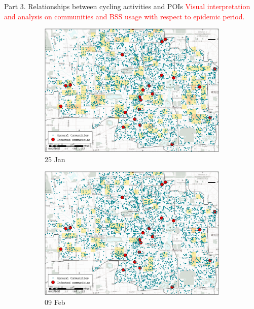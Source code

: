 \documentclass[preprints,ijgi,submit,moreauthors]{Definitions/mdpi}
\begin{document}
Part 3. Relationships between cycling activities and POIs
\textcolor{red}{Visual interpretation and analysis on communities and BSS usage with respect to epidemic period.}
\begin{figure}[H]
    \centering
    \begin{subfigure}{.23\textwidth}
        \includegraphics[width=\textwidth]{Figures/Figure10/POI_resD2020_01_25.eps}
        \caption{25 Jan}
    \end{subfigure}
    \begin{subfigure}{.23\textwidth}
        \includegraphics[width=\textwidth]{Figures/Figure10/POI_resD2020_02_09.eps}
        \caption{09 Feb}
    \end{subfigure}
    \begin{subfigure}{.23\textwidth}

\end{subfigure}
\end{figure}
\end{document}
